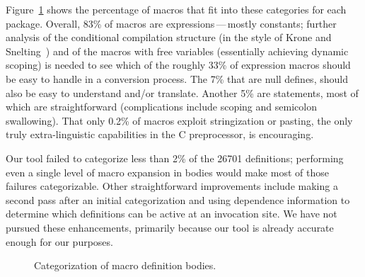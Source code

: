 \documentclass[11pt]{article}
\begin{document}
Figure~\ref{fig:categorization} shows the percentage of macros that fit
into these categories for each package.  Overall, 83\% of macros are
expressions\,---\,mostly constants; further analysis of the conditional
compilation structure (in the style of Krone and Snelting~\cite{Krone94})
and of the macros with free variables (essentially achieving dynamic
scoping) is needed to see which of the roughly 33\% of expression macros
should be easy to handle in a conversion process.  The 7\% that are null
defines, should also be easy to understand and/or translate.  Another 5\%
are statements, most of which are straightforward (complications include
scoping and semicolon swallowing).  That only 0.2\% of macros exploit
stringization or pasting, the only truly extra-linguistic capabilities in
the C preprocessor, is encouraging.

Our tool failed to categorize less than 2\% of the 26701 definitions;
performing even a single level of macro expansion in bodies would make most
of those failures categorizable.  Other straightforward improvements
include making a second pass after an initial categorization and using
dependence information to determine which definitions can be active at an
invocation site.  We have not pursued these enhancements, primarily because
our tool is already accurate enough for our purposes.


\begin{figure}
\centerline{}
\caption{Categorization of macro definition bodies.}
\label{fig:categorization}
\end{figure}





\end{document}
